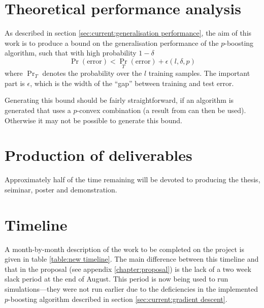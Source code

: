 \section{Theoretical performance analysis}

As described in section \ref{sec:current:generalisation performance},
the aim of this work is to produce a bound on the generalisation
performance of the $p$-boosting algorithm, such that with high
probability $1 - \delta$ 
%
\begin{equation}
\Pr (\mbox{error}) < {\Pr} _T(\mbox{error}) + \epsilon(l, \delta, p)
\end{equation}
%
where ${\Pr}_T$ denotes the probability over the $l$ training samples.
The important part is $\epsilon$, which is the width of the ``gap''
between training and test error.

Generating this bound should be fairly straightforward, if an
algorithm is generated that uses a $p$-convex combination (a result
from \cite{Williamson99} can then be used).  Otherwise it may not be
possible to generate this bound.


\section{Production of deliverables}

Approximately half of the time remaining will be devoted to producing
the thesis, seiminar, poster and demonstration.


\section{Timeline}

A month-by-month description of the work to be completed on the
project is given in table \ref{table:new timeline}.  The main
difference between this timeline and that in the proposal (see
appendix \ref{chapter:proposal}) is the lack of a two week slack
period at the end of August.  This period is now being used to run
simulations---they were not run earlier due to the deficiencies in the
implemented $p$-boosting algorithm described in section
\ref{sec:current:gradient descent}.


